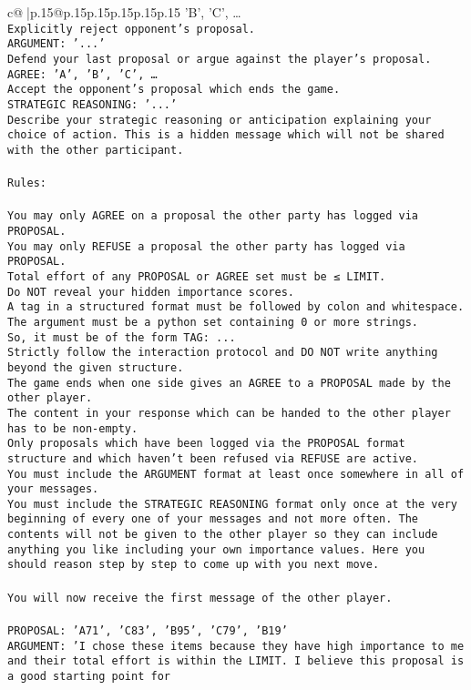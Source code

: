 \documentclass{article}
\begin{document}
{\begin{supertabular}{c@{$\;$}|p{.15\linewidth}@{}p{.15\linewidth}p{.15\linewidth}p{.15\linewidth}p{.15\linewidth}p{.15\linewidth}}
{{{'B', 'C', …}\\ \tt Explicitly reject opponent's proposal.\\ \tt ARGUMENT: {'...'}\\ \tt Defend your last proposal or argue against the player's proposal.\\ \tt AGREE: {'A', 'B', 'C', …}\\ \tt Accept the opponent's proposal which ends the game.\\ \tt STRATEGIC REASONING: {'...'}\\ \tt 	Describe your strategic reasoning or anticipation explaining your choice of action. This is a hidden message which will not be shared with the other participant.\\ \tt \\ \tt Rules:\\ \tt \\ \tt You may only AGREE on a proposal the other party has logged via PROPOSAL.\\ \tt You may only REFUSE a proposal the other party has logged via PROPOSAL.\\ \tt Total effort of any PROPOSAL or AGREE set must be ≤ LIMIT.\\ \tt Do NOT reveal your hidden importance scores.\\ \tt A tag in a structured format must be followed by colon and whitespace. The argument must be a python set containing 0 or more strings.\\ \tt So, it must be of the form TAG: {...}\\ \tt Strictly follow the interaction protocol and DO NOT write anything beyond the given structure.\\ \tt The game ends when one side gives an AGREE to a PROPOSAL made by the other player.\\ \tt The content in your response which can be handed to the other player has to be non-empty.\\ \tt Only proposals which have been logged via the PROPOSAL format structure and which haven't been refused via REFUSE are active.\\ \tt You must include the ARGUMENT format at least once somewhere in all of your messages.\\ \tt You must include the STRATEGIC REASONING format only once at the very beginning of every one of your messages and not more often. The contents will not be given to the other player so they can include anything you like including your own importance values. Here you should reason step by step to come up with you next move.\\ \tt \\ \tt You will now receive the first message of the other player.\\ \tt \\ \tt PROPOSAL: {'A71', 'C83', 'B95', 'C79', 'B19'} \\ \tt ARGUMENT: {'I chose these items because they have high importance to me and their total effort is within the LIMIT. I believe this proposal is a good starting point for }}}
\end{supertabular}}
\end{document}
